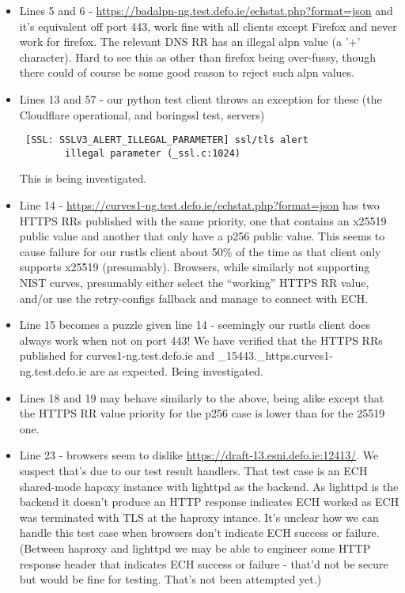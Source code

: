 
\begin{itemize}

    \item Lines 5 and 6 -
        \url{https://badalpn-ng.test.defo.ie/echstat.php?format=json} and it's
        equivalent off port 443, work fine with all clients except Firefox and
        never work for firefox. The relevant DNS RR has an illegal alpn value
        (a '+' character). Hard to see this as other than firefox being
        over-fussy, though there could of course be some good reason to reject
        such alpn values.

    \item Lines 13 and 57 - our python test client throws an exception for
        these (the Cloudflare operational, and boringssl test, servers)
        \begin{verbatim} [SSL: SSLV3_ALERT_ILLEGAL_PARAMETER] ssl/tls alert
        illegal parameter (_ssl.c:1024) \end{verbatim} This is being
        investigated.

    \item Line 14 -
        \url{https://curves1-ng.test.defo.ie/echstat.php?format=json} has two
        HTTPS RRs published with the same priority, one that contains an x25519
        public value and another that only have a p256 public value. This seems
        to cause failure for our rustls client about 50\% of the time as that
        client only supports x25519 (presumably). Browsers, while similarly not
        supporting NIST curves, presumably either select the ``working'' HTTPS
        RR value, and/or use the retry-configs fallback and manage to connect
        with ECH.

    \item Line 15 becomes a puzzle given line 14 - seemingly our rustls client
        does always work when not on port 443! We have verified that the HTTPS
        RRs published for curves1-ng.test.defo.ie and
        \_15443.\_https.curves1-ng.test.defo.ie are as expected. Being
        investigated.

    \item Lines 18 and 19 may behave similarly to the above, being alike except
        that the HTTPS RR value priority for the p256 case is lower than for
        the 25519 one.

    \item Line 23 - browsers seem to dislike
        \url{https://draft-13.esni.defo.ie:12413/}.  We suspect that's due to
        our test result handlers. That test case is an ECH shared-mode hapoxy
        instance with lighttpd as the backend. As lighttpd is the backend it
        doesn't produce an HTTP response indicates ECH worked as ECH was
        terminated with TLS at the haproxy intance. It's unclear how we can
        handle this test case when browsers don't indicate ECH success or
        failure. (Between haproxy and lighttpd we may be able to engineer some
        HTTP response header that indicates ECH success or failure - that'd not
        be secure but would be fine for testing. That's not been attempted
        yet.)


\end{itemize}
